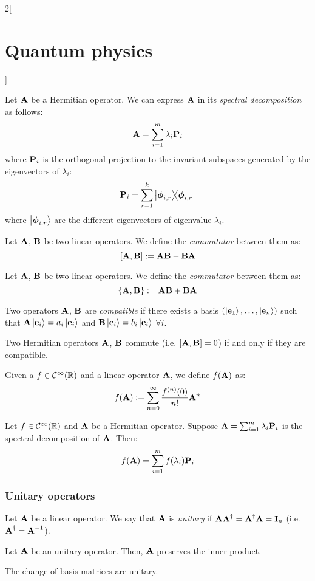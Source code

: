 \documentclass[../../../main_physics.tex]{subfiles}
\begin{document}
\begin{multicols}{2}[\section{Quantum physics}]
\begin{definition}
  \end{definition}
  \begin{proposition}
    Let $\boldsymbol{\mathrm{A}}$ be a Hermitian operator. We can express $\boldsymbol{\mathrm{A}}$ in its \emph{spectral decomposition} as follows: $$\boldsymbol{\mathrm{A}}=\sum_{i=1}^m\lambda_i\boldsymbol{\mathrm{P}}_i$$
    where $\boldsymbol{\mathrm{P}}_i$ is the orthogonal projection to the invariant subspaces generated by the eigenvectors of $\lambda_i$: $$\vf{P}_i=\sum_{r=1}^k\dyad{\vf\phi_{i,r}}{\vf\phi_{i,r}}$$
    where $\ket{\boldsymbol{\mathrm{\phi}}_{i,r}}$ are the different eigenvectors of eigenvalue $\lambda_i$.
  \end{proposition}
  \begin{definition}[Commutator]
    Let $\boldsymbol{\mathrm{A}}$, $\boldsymbol{\mathrm{B}}$ be two linear operators. We define the \emph{commutator} between them as: $$\comm{\vf{A}}{\vf{B}}:=\vf{AB}-\vf{BA}$$
  \end{definition}
  \begin{definition}[Anticommutator]
    Let $\boldsymbol{\mathrm{A}}$, $\boldsymbol{\mathrm{B}}$ be two linear operators. We define the \emph{commutator} between them as: $$\acomm{\vf{A}}{\vf{B}}:=\vf{AB}+\vf{BA}$$
  \end{definition}
  \begin{definition}
    Two operators $\boldsymbol{\mathrm{A}}$, $\boldsymbol{\mathrm{B}}$ are \emph{compatible} if there exists a basis $(\ket{\boldsymbol{\mathrm{e}}_1},\ldots,\ket{\boldsymbol{\mathrm{e}}_n})$ such that $\boldsymbol{\mathrm{A}}\ket{\boldsymbol{\mathrm{e}}_i}=a_i\ket{\boldsymbol{\mathrm{e}}_i}$ and $\boldsymbol{\mathrm{B}}\ket{\boldsymbol{\mathrm{e}}_i}=b_i\ket{\boldsymbol{\mathrm{e}}_i}$ $\forall i$.
  \end{definition}
  \begin{theorem}
    Two Hermitian operators $\boldsymbol{\mathrm{A}}$, $\boldsymbol{\mathrm{B}}$ commute (i.e. $\comm{\vf{A}}{\vf{B}}=0$) if and only if they are compatible.
  \end{theorem}
  \begin{definition}
    Given a $f\in\mathcal{C}^\infty(\mathbb{R})$ and a linear operator $\boldsymbol{\mathrm{A}}$, we define $f(\boldsymbol{\mathrm{A}})$ as: $$f(\boldsymbol{\mathrm{A}}):=\sum_{n=0}^\infty \frac{f^{(n)}(0)}{n!}\boldsymbol{\mathrm{A}}^n$$
  \end{definition}
  \begin{proposition}
    Let $f\in\mathcal{C}^\infty(\mathbb{R})$ and $\boldsymbol{\mathrm{A}}$ be a Hermitian operator. Suppose $\boldsymbol{\mathrm{A}}=\sum_{i=1}^m\lambda_i\boldsymbol{\mathrm{P}}_i$ is the spectral decomposition of $\boldsymbol{\mathrm{A}}$. Then: $$f(\boldsymbol{\mathrm{A}})=\sum_{i=1}^mf(\lambda_i)\boldsymbol{\mathrm{P}}_i$$
  \end{proposition}
  \subsubsection{Unitary operators}
  \begin{definition}
    Let $\boldsymbol{\mathrm{A}}$ be a linear operator. We say that $\boldsymbol{\mathrm{A}}$ is \emph{unitary} if $\boldsymbol{\mathrm{A}}\boldsymbol{\mathrm{A}}^\dag=\boldsymbol{\mathrm{A}}^\dag\boldsymbol{\mathrm{A}}=\boldsymbol{\mathrm{I}}_n$ (i.e. $\boldsymbol{\mathrm{A}}^\dag=\boldsymbol{\mathrm{A}}^{-1}$).
  \end{definition}
  \begin{proposition}
    Let $\boldsymbol{\mathrm{A}}$ be an unitary operator. Then, $\boldsymbol{\mathrm{A}}$ preserves the inner product.
  \end{proposition}
  \begin{proposition}
    The change of basis matrices are unitary.
  \end{proposition}

\end{multicols}
\end{document}
